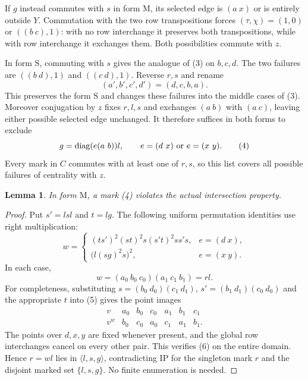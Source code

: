 \documentclass[11pt,a4paper]{article}
\newtheorem{lemma}{Lemma}
\newcommand{\gen}[1]{\langle#1\rangle}
\newcommand{\diag}{\operatorname{diag}}
\begin{document}
If $g$ instead commutes with $s$ in form $\mathrm M$, its
selected edge is $(a\ x)$ or is entirely outside $Y$. Commutation
with the two row transpositions forces $(\tau,\chi)=(1,0)$
or $((b\ c),1)$: with no row interchange it preserves both
transpositions, while with row interchange it exchanges them.
Both possibilities commute with $z$.

In form $\mathrm S$, commuting with $s$ gives the analogue of
(3) on $b,c,d$. The two failures are $((b\ d),1)$ and
$((c\ d),1)$. Reverse $r,s$ and rename
\[
                  (a',b',c',d')=(d,c,b,a).
\]
This preserves the form $\mathrm S$ and changes these failures
into the middle cases of (3). Moreover conjugation by $z$ fixes
$r,l,s$ and exchanges $(a\ b)$ with $(a\ c)$, leaving either
possible selected edge unchanged. It therefore suffices in both
forms to exclude
\[
       g=\diag(e(a\ b))l,\qquad
       e=(d\ x)\ \hbox{or}\ e=(x\ y).                       \tag{4}
\]
Every mark in $C$ commutes with at least one of $r,s$, so this
list covers all possible failures of centrality with $z$.

\begin{lemma}\label{mixed}
In form $\mathrm M$, a mark (4) violates the actual intersection
property.
\end{lemma}
\begin{proof}
Put $s'=lsl$ and $t=lg$. The following uniform permutation
identities use right multiplication:
\[
 w=\begin{cases}
 (ts')^2(st)^2s(s't)^2ss's,& e=(d\ x),\\
 \bigl(l(sg)^2s\bigr)^2,& e=(x\ y).
 \end{cases}                                                \tag{5}
\]
In each case,
\[
                  w=(a_0\ b_0\ c_0)(a_1\ c_1\ b_1)=rl.
                                                               \tag{6}
\]
For completeness, substituting $s=(b_0\ d_0)(c_1\ d_1)$,
$s'=(b_1\ d_1)(c_0\ d_0)$ and the appropriate $t$
into (5) gives the point images
\[
\begin{array}{c|rrrrrr}
v&a_0&b_0&c_0&a_1&b_1&c_1\\\hline
v^w&b_0&c_0&a_0&c_1&a_1&b_1.
\end{array}
\]
The points over $d,x,y$ are fixed whenever present, and the
global row interchanges cancel on every other pair. This verifies
(6) on the entire domain. Hence $r=wl$ lies in $\gen{l,s,g}$,
contradicting IP for the singleton mark $r$ and the disjoint
marked set $\{l,s,g\}$. No finite enumeration is needed.
\end{proof}
\end{document}
